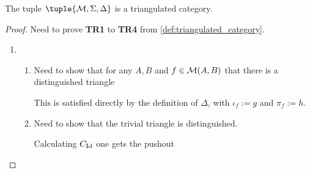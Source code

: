 \begin{definition}
    The tuple \( \tuple{\Mc, \Sigma, \Delta} \) is a triangulated category.
\end{definition}
\begin{proof}
    Need to prove {\bf TR1} to {\bf TR4} from \autoref{def:triangulated_category}.

    \begin{enumerate}[label={(\bfseries TR\arabic*)}]
        \item {
            \begin{enumerate}
                \item {
                    Need to show that for any \( A, B \) and \( f \in {\mathcal{M}}(A, B) \) that there is a distinguished triangle
                    \begin{center}
                    \end{center}

                    This is satisfied directly by the definition of \( \Delta \), with \( \iota_f := g \) and \( \pi_f := h \).
                }
                \item {
                    Need to show that the trivial triangle is distinguished.

                    Calculating \( C_{\operatorname{Id}} \) one gets the pushout
                    \begin{center}
\end{center}}
\end{enumerate}}
\end{enumerate}
\end{proof}
